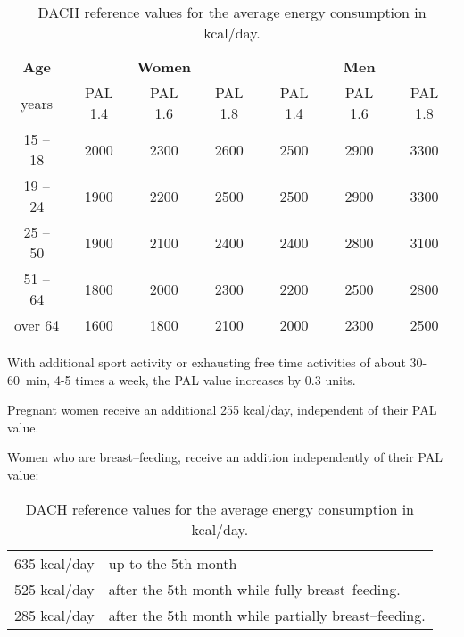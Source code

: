 \documentclass[../main.tex]{subfiles}
\begin{document}
\begin{table}[htb]
  \begin{center}
  \begin{tabular}{c|ccc|ccc}
    \textbf{Age} & \multicolumn{3}{c}{\textbf{Women}} & \multicolumn{3}{c}{\textbf{Men}} \\
    years & PAL 1.4 & PAL 1.6 & PAL 1.8 & PAL 1.4 & PAL 1.6 & PAL 1.8 \\
    \hline
    15 -- 18 & 2000 & 2300 & 2600 & 2500 & 2900 & 3300 \\
    19 -- 24 & 1900 & 2200 & 2500 & 2500 & 2900 & 3300 \\
    25 -- 50 & 1900 & 2100 & 2400 & 2400 & 2800 & 3100 \\
    51 -- 64 & 1800 & 2000 & 2300 & 2200 & 2500 & 2800 \\
    over 64 & 1600 & 1800 & 2100 & 2000 & 2300 & 2500 \\
  \end{tabular}
  \end{center}

  \begin{small}
  \noindent With additional sport activity or exhausting free time activities of about 30-60~min, 4-5 times a week, the PAL value increases by 0.3 units.

  \vspace{1mm}
  \noindent Pregnant women receive an additional 255 kcal/day, independent of their PAL value.

  \vspace{1mm}
  \noindent Women who are breast--feeding, receive an addition independently of their PAL value:

  \begin{tabular}{ll}
    635 kcal/day & up to the 5th month \\
    525 kcal/day & after the 5th month while fully breast--feeding.\\
    285 kcal/day & after the 5th month while partially breast--feeding.
  \end{tabular}
  \end{small}
  \caption{DACH reference values for the average energy consumption in kcal/day.}
\end{table}

  
\end{document}
